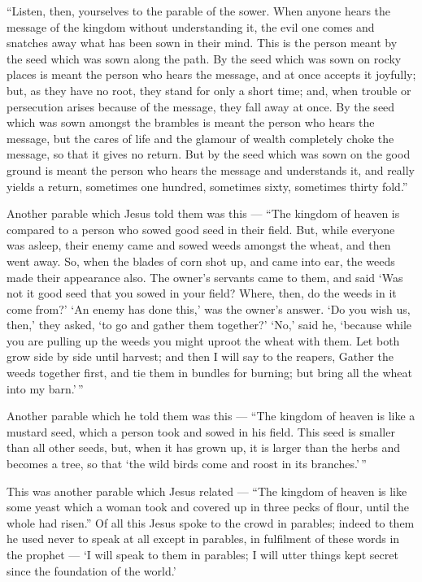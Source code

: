  ``Listen, then, yourselves to the parable of the sower.
 When anyone hears the message of the kingdom without
understanding it, the evil one comes and snatches away what has been
sown in their mind. This is the person meant by the seed which was sown
along the path.  By the seed which was sown on rocky places
is meant the person who hears the message, and at once accepts it
joyfully;  but, as they have no root, they stand for only a
short time; and, when trouble or persecution arises because of the
message, they fall away at once.  By the seed which was
sown amongst the brambles is meant the person who hears the message, but
the cares of life and the glamour of wealth completely choke the
message, so that it gives no return.  But by the seed which
was sown on the good ground is meant the person who hears the message
and understands it, and really yields a return, sometimes one hundred,
sometimes sixty, sometimes thirty fold.''

 Another parable which Jesus told them was this --- ``The
kingdom of heaven is compared to a person who sowed good seed in their
field.  But, while everyone was asleep, their enemy came
and sowed weeds amongst the wheat, and then went away.  So,
when the blades of corn shot up, and came into ear, the weeds made their
appearance also.  The owner's servants came to them, and
said `Was not it good seed that you sowed in your field? Where, then, do
the weeds in it come from?'  `An enemy has done this,' was
the owner's answer. `Do you wish us, then,' they asked, `to go and
gather them together?'  `No,' said he, `because while you
are pulling up the weeds you might uproot the wheat with them.
 Let both grow side by side until harvest; and then I will
say to the reapers, Gather the weeds together first, and tie them in
bundles for burning; but bring all the wheat into my barn.'\,''

 Another parable which he told them was this --- ``The
kingdom of heaven is like a mustard seed, which a person took and sowed
in his field.  This seed is smaller than all other seeds,
but, when it has grown up, it is larger than the herbs and becomes a
tree, so that `the wild birds come and roost in its branches.'\,''

 This was another parable which Jesus related --- ``The
kingdom of heaven is like some yeast which a woman took and covered up
in three pecks of flour, until the whole had risen.''  Of
all this Jesus spoke to the crowd in parables; indeed to them he used
never to speak at all except in parables,  in fulfilment of
these words in the prophet --- `I will speak to them in parables; I will
utter things kept secret since the foundation of the world.'

